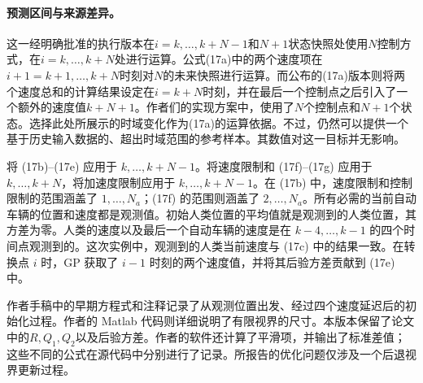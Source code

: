 \documentclass{article}
\begin{document}
\paragraph{预测区间与来源差异。}
这一经明确批准的执行版本在$i=k,\dots,k+N-1$和$N+1$状态快照处使用$N$控制方式，在$i=k,\dots,k+N$处进行运算。公式(17a)中的两个速度项在$i+1=k+1,\dots,k+N$时刻对$N$的未来快照进行运算。而公布的(17a)版本则将两个速度总和的计算结果设定在$i=k+N$时刻，并在最后一个控制点之后引入了一个额外的速度值$k+N+1$。作者们的实现方案中，使用了$N$个控制点和$N+1$个状态。选择此处所展示的时域变化作为(17a)的运算依据。不过，仍然可以提供一个基于历史输入数据的、超出时域范围的参考样本。其数值对这一目标并无影响。

将 (17b)–(17e) 应用于 $k,\dots,k+N-1$。将速度限制和 (17f)–(17g) 应用于 $k,\dots,k+N$，将加速度限制应用于 $k,\dots,k+N-1$。在 (17b) 中，速度限制和控制限制的范围涵盖了 $1,\dots,N_a$；(17f) 的范围则涵盖了 $2,\dots,N_a$。所有必需的当前自动车辆的位置和速度都是观测值。初始人类位置的平均值就是观测到的人类位置，其方差为零。人类的速度以及最后一个自动车辆的速度是在 $k-4,\dots,k-1$ 的四个时间点观测到的。这次实例中，观测到的人类当前速度与 (17c) 中的结果一致。在转换点 $i$ 时，GP 获取了 $i-1$ 时刻的两个速度值，并将其后验方差贡献到 (17e) 中。

作者手稿中的早期方程式和注释记录了从观测位置出发、经过四个速度延迟后的初始化过程。作者的 Matlab 代码则详细说明了有限视界的尺寸。本版本保留了论文中的$R,Q_1,Q_2$以及后验方差。作者的软件还计算了平滑项，并输出了标准差值；这些不同的公式在源代码中分别进行了记录。所报告的优化问题仅涉及一个后退视界更新过程。
\end{document}
